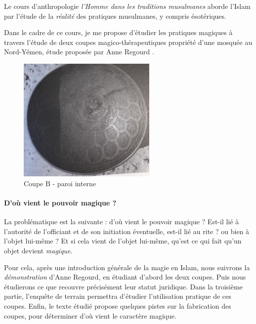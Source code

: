 


Le cours d'anthropologie \textit{l'Homme dans les traditions musulmanes} aborde l'Islam par l'étude de la \textit{réalité} des pratiques musulmanes, y compris ésotériques. 

Dans le cadre de ce cours, je me propose d'étudier les pratiques magiques à travers l'étude de deux coupes magico-thérapeutiques propriété d'une mosquée au Nord-Yémen, étude proposée par Anne Regourd \citep{Regourd_2007}.
\begin{figure}
    \centering
      
 \includegraphics[width=0.6\textwidth]{HommeetIslam/Images/IMG_2457recadre.png}
 \caption{Coupe B  - paroi interne}
 
    \label{fig:my_label}
\end{figure}
\paragraph{D'où vient le pouvoir magique ?} La problématique est la suivante : d'où vient le pouvoir magique ? Est-il lié à l'autorité de l'officiant et de son initiation éventuelle, est-il lié au rite ? ou bien à l'objet lui-même ? Et si cela vient de l'objet lui-même, qu'est ce qui fait qu'un objet devient \textit{magique}.

Pour cela, après une introduction générale de la magie en Islam, nous suivrons la \textit{démonstration} d'Anne Regourd, en étudiant d'abord les deux coupes. Puis nous étudierons ce que recouvre précisément leur statut juridique. Dans la troisième partie, l'enquête de terrain permettra d'étudier l'utilisation pratique de ces coupes. Enfin, le texte étudié propose quelques pistes sur la fabrication des coupes, pour déterminer d'où vient le caractère magique. 

